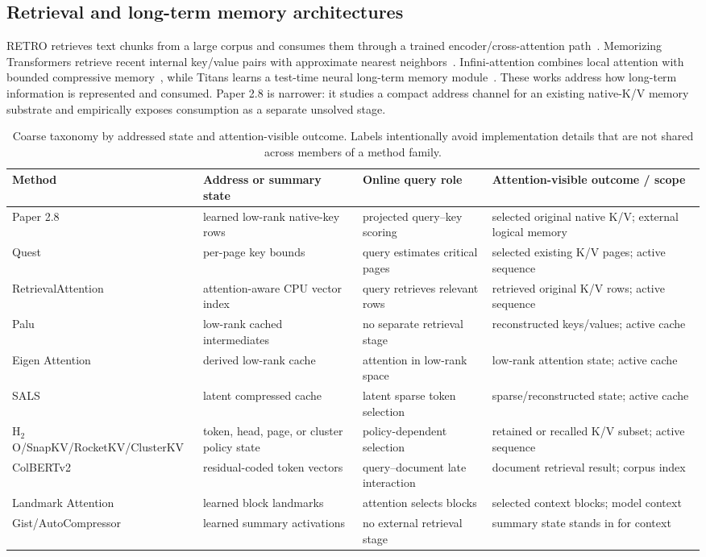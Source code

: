 \documentclass[11pt]{article}
\newcommand{\kv}{\textsc{K/V}\xspace}
\begin{document}
\subsection{Retrieval and long-term memory architectures}
RETRO retrieves text chunks from a large corpus and consumes them through a
trained encoder/cross-attention path~\cite{borgeaud2022retro}. Memorizing
Transformers retrieve recent internal key/value pairs with approximate nearest
neighbors~\cite{wu2022memorizing}. Infini-attention combines local attention
with bounded compressive memory~\cite{munkhdalai2024infini}, while Titans learns
a test-time neural long-term memory module~\cite{behrouz2025titans}. These works
address how long-term information is represented and consumed. Paper 2.8 is
narrower: it studies a compact address channel for an existing native-\kv
memory substrate and empirically exposes consumption as a separate unsolved
stage.

\begin{table}[H]
\centering
\footnotesize
\caption{Coarse taxonomy by addressed state and attention-visible outcome.
Labels intentionally avoid implementation details that are not shared across
members of a method family.}
\label{tab:taxonomy}
\begin{tabularx}{\linewidth}{lYYY}
\toprule
Method & Address or summary state & Online query role & Attention-visible outcome / scope \\
\midrule
Paper 2.8 & learned low-rank native-key rows & projected query--key scoring & selected original native \kv; external logical memory \\
Quest & per-page key bounds & query estimates critical pages & selected existing \kv pages; active sequence \\
RetrievalAttention & attention-aware CPU vector index & query retrieves relevant rows & retrieved original \kv rows; active sequence \\
Palu & low-rank cached intermediates & no separate retrieval stage & reconstructed keys/values; active cache \\
Eigen Attention & derived low-rank cache & attention in low-rank space & low-rank attention state; active cache \\
SALS & latent compressed cache & latent sparse token selection & sparse/reconstructed state; active cache \\
H$_2$O/SnapKV/RocketKV/ClusterKV & token, head, page, or cluster policy state & policy-dependent selection & retained or recalled \kv subset; active sequence \\
ColBERTv2 & residual-coded token vectors & query--document late interaction & document retrieval result; corpus index \\
Landmark Attention & learned block landmarks & attention selects blocks & selected context blocks; model context \\
Gist/AutoCompressor & learned summary activations & no external retrieval stage & summary state stands in for context \\
\bottomrule
\end{tabularx}
\end{table}
\end{document}
